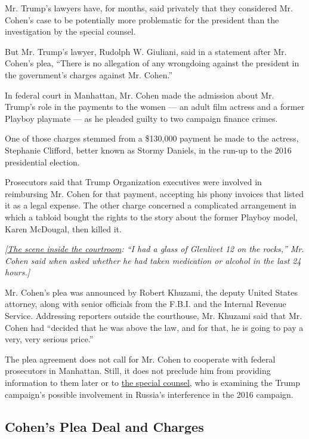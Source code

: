 Mr. Trump's lawyers have, for months, said privately that they
considered Mr. Cohen's case to be potentially more problematic for the
president than the investigation by the special counsel.

But Mr. Trump's lawyer, Rudolph W. Giuliani, said in a statement after
Mr. Cohen's plea, ``There is no allegation of any wrongdoing against the
president in the government's charges against Mr. Cohen.''

In federal court in Manhattan, Mr. Cohen made the admission about Mr.
Trump's role in the payments to the women --- an adult film actress and
a former Playboy playmate --- as he pleaded guilty to two campaign
finance crimes.

One of those charges stemmed from a \$130,000 payment he made to the
actress, Stephanie Clifford, better known as Stormy Daniels, in the
run-up to the 2016 presidential election.

Prosecutors said that Trump Organization executives were involved in
reimbursing Mr. Cohen for that payment, accepting his phony invoices
that listed it as a legal expense. The other charge concerned a
complicated arrangement in which a tabloid bought the rights to the
story about the former Playboy model, Karen McDougal, then killed it.

\emph{{[}}\href{https://www.nytimes3xbfgragh.onion/2018/08/21/nyregion/michael-cohen-guilty-glenlivet-trump.html}{\emph{The
scene inside the courtroom}}\emph{: ``I had a glass of Glenlivet 12 on
the rocks,'' Mr. Cohen said when asked whether he had taken medication
or alcohol in the last 24 hours.{]}}

Mr. Cohen's plea was announced by Robert Khuzami, the deputy United
States attorney, along with senior officials from the F.B.I. and the
Internal Revenue Service. Addressing reporters outside the courthouse,
Mr. Khuzami said that Mr. Cohen had ``decided that he was above the law,
and for that, he is going to pay a very, very serious price.''

The plea agreement does not call for Mr. Cohen to cooperate with federal
prosecutors in Manhattan. Still, it does not preclude him from providing
information to them later or to
\href{https://www.nytimes3xbfgragh.onion/2018/08/16/us/politics/special-counsel-investigation-mueller.html}{the
special counsel,} who is examining the Trump campaign's possible
involvement in Russia's interference in the 2016 campaign.

\hypertarget{cohens-plea-deal-and-charges}{%
\subsection{Cohen's Plea Deal and
Charges}\label{cohens-plea-deal-and-charges}}

